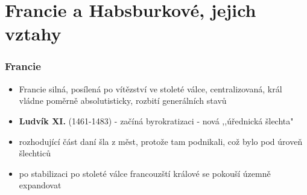 \documentclass{article}
\begin{document}
\part{Francie a Habsburkové, jejich vztahy}
\section{Francie}
\begin{itemize}
  \item Francie silná, posílená po vítězství ve stoleté válce, centralizovaná, král vládne poměrně absolutisticky, rozbití generálních stavů
  \item \textbf{Ludvík XI.} (1461-1483) - začíná byrokratizaci - nová ,,úřednická šlechta"
  \item rozhodující část daní šla z měst, protože tam podnikali, což bylo pod úroveň šlechticů
  \item po stabilizaci po stoleté válce francouzští králové se pokouší územně expandovat
\end{itemize}
\end{document}

